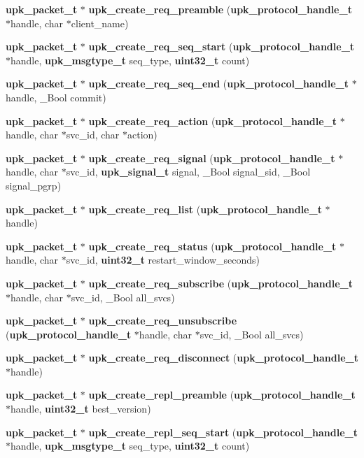 \begin{DoxyCompactItemize}
\item 
{\bf upk\_\-packet\_\-t} $\ast$ {\bf upk\_\-create\_\-req\_\-preamble} ({\bf upk\_\-protocol\_\-handle\_\-t} $\ast$handle, char $\ast$client\_\-name)
\item 
{\bf upk\_\-packet\_\-t} $\ast$ {\bf upk\_\-create\_\-req\_\-seq\_\-start} ({\bf upk\_\-protocol\_\-handle\_\-t} $\ast$handle, {\bf upk\_\-msgtype\_\-t} seq\_\-type, {\bf uint32\_\-t} count)
\item 
{\bf upk\_\-packet\_\-t} $\ast$ {\bf upk\_\-create\_\-req\_\-seq\_\-end} ({\bf upk\_\-protocol\_\-handle\_\-t} $\ast$handle, \_\-Bool commit)
\item 
{\bf upk\_\-packet\_\-t} $\ast$ {\bf upk\_\-create\_\-req\_\-action} ({\bf upk\_\-protocol\_\-handle\_\-t} $\ast$handle, char $\ast$svc\_\-id, char $\ast$action)
\item 
{\bf upk\_\-packet\_\-t} $\ast$ {\bf upk\_\-create\_\-req\_\-signal} ({\bf upk\_\-protocol\_\-handle\_\-t} $\ast$handle, char $\ast$svc\_\-id, {\bf upk\_\-signal\_\-t} signal, \_\-Bool signal\_\-sid, \_\-Bool signal\_\-pgrp)
\item 
{\bf upk\_\-packet\_\-t} $\ast$ {\bf upk\_\-create\_\-req\_\-list} ({\bf upk\_\-protocol\_\-handle\_\-t} $\ast$handle)
\item 
{\bf upk\_\-packet\_\-t} $\ast$ {\bf upk\_\-create\_\-req\_\-status} ({\bf upk\_\-protocol\_\-handle\_\-t} $\ast$handle, char $\ast$svc\_\-id, {\bf uint32\_\-t} restart\_\-window\_\-seconds)
\item 
{\bf upk\_\-packet\_\-t} $\ast$ {\bf upk\_\-create\_\-req\_\-subscribe} ({\bf upk\_\-protocol\_\-handle\_\-t} $\ast$handle, char $\ast$svc\_\-id, \_\-Bool all\_\-svcs)
\item 
{\bf upk\_\-packet\_\-t} $\ast$ {\bf upk\_\-create\_\-req\_\-unsubscribe} ({\bf upk\_\-protocol\_\-handle\_\-t} $\ast$handle, char $\ast$svc\_\-id, \_\-Bool all\_\-svcs)
\item 
{\bf upk\_\-packet\_\-t} $\ast$ {\bf upk\_\-create\_\-req\_\-disconnect} ({\bf upk\_\-protocol\_\-handle\_\-t} $\ast$handle)
\item 
{\bf upk\_\-packet\_\-t} $\ast$ {\bf upk\_\-create\_\-repl\_\-preamble} ({\bf upk\_\-protocol\_\-handle\_\-t} $\ast$handle, {\bf uint32\_\-t} best\_\-version)
\item 
{\bf upk\_\-packet\_\-t} $\ast$ {\bf upk\_\-create\_\-repl\_\-seq\_\-start} ({\bf upk\_\-protocol\_\-handle\_\-t} $\ast$handle, {\bf upk\_\-msgtype\_\-t} seq\_\-type, {\bf uint32\_\-t} count)
\item 

\end{DoxyCompactItemize}
